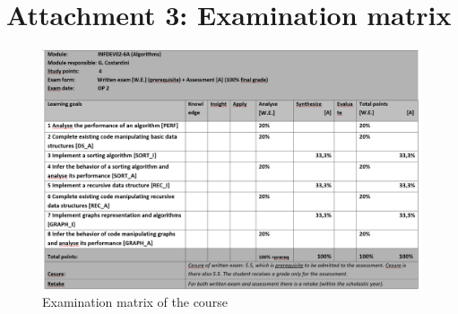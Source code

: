 \section*{Attachment 3: Examination matrix}

\begin{figure}[!h]
	\centering
	\includegraphics[scale=0.6]{img/toetsmatrijs}
	\caption{Examination matrix of the course}
	\label{img:Ex1}
\end{figure}

